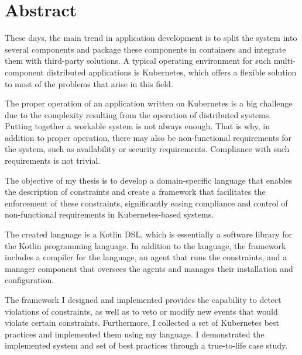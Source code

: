 \vfill
\selectenglish


\chapter*{Abstract}

These days, the main trend in application development is to split the system into several components and package these components in containers and integrate them with third-party solutions. A typical operating environment for such multi-component distributed applications is Kubernetes, which offers a flexible solution to most of the problems that arise in this field.

The proper operation of an application written on Kubernetes is a big challenge due to the complexity resulting from the operation of distributed systems. Putting together a workable system is not always enough. That is why, in addition to proper operation, there may also be non-functional requirements for the system, such as availability or security requirements. Compliance with such requirements is not trivial.

The objective of my thesis is to develop a domain-specific language that enables the description of constraints and create a framework that facilitates the enforcement of these constraints, significantly easing compliance and control of non-functional requirements in Kubernetes-based systems.

The created language is a Kotlin DSL, which is essentially a software library for the Kotlin programming language. In addition to the language, the framework includes a compiler for the language, an agent that runs the constraints, and a manager component that oversees the agents and manages their installation and configuration.

The framework I designed and implemented provides the capability to detect violations of constraints, as well as to veto or modify new events that would violate certain constraints. Furthermore, I collected a set of Kubernetes best practices and implemented them using my language. I demonstrated the implemented system and set of best practices through a true-to-life case study.

\vfill
\cleardoublepage

\selectthesislanguage

\setcounter{romanPage}{\value{page}}
